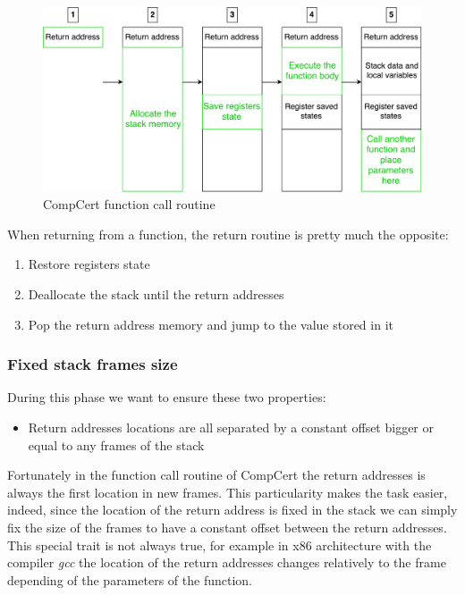 \documentclass[11pt]{sdm}
\begin{document}
\begin{figure}
\centering
\includegraphics[scale=0.55]{images/call_routine.pdf}
\caption{CompCert function call routine}
\label{call_routine}
\end{figure}

When returning from a function, the return routine is pretty much the opposite:
\begin{enumerate}
	\item Restore registers state
	\item Deallocate the stack until the return addresses
	\item Pop the return address memory and jump to the value stored in it
\end{enumerate}


\subsubsection{Fixed stack frames size}
\label{sub:Fixed stack frames size}
During this phase we want to ensure these two properties:
\begin{itemize}[noitemsep]
	\item Return addresses locations are all separated by a constant offset bigger or equal to any frames of the stack
\end{itemize}

Fortunately in the function call routine of CompCert the return addresses is always the first location in new frames.
This particularity makes the task easier, indeed, since the location of the return address is fixed in the stack we can simply fix the size of the frames to have a constant offset between the return addresses. 
This special trait is not always true, for example in x86 architecture with the compiler \textit{gcc} the location of the return addresses changes relatively to the frame depending of the parameters of the function.
\end{document}
